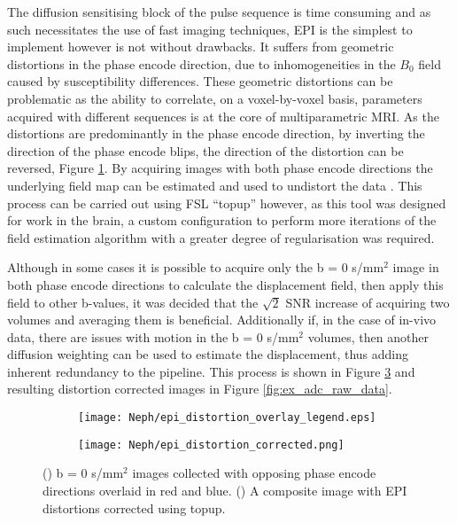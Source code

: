 The diffusion sensitising block of the pulse sequence is time consuming and as such necessitates the use of fast imaging techniques, \ac{EPI} is the simplest to implement however is not without drawbacks. It suffers from geometric distortions in the phase encode direction, due to inhomogeneities in the $B_0$ field caused by susceptibility differences. These geometric distortions can be problematic as the ability to correlate, on a voxel-by-voxel basis, parameters acquired with different sequences is at the core of multiparametric \ac{MRI}. As the distortions are predominantly in the phase encode direction, by inverting the direction of the phase encode blips, the direction of the distortion can be reversed, Figure \ref{fig:ex_epi_distortion_overlay}. By acquiring images with both phase encode directions the underlying field map can be estimated and used to undistort the data \cite{andersson_how_2003}. This process can be carried out using \ac{FSL} ``topup'' however, as this tool was designed for work in the brain, a custom configuration to perform more iterations of the field estimation algorithm with a greater degree of regularisation was required. 

Although in some cases it is possible to acquire only the b = 0 s/mm$^2$ image in both phase encode directions to calculate the displacement field, then apply this field to other b-values, it was decided that the $\sqrt{2}$ \ac{SNR} increase of acquiring two volumes and averaging them is beneficial. Additionally if, in the case of in-vivo data, there are issues with motion in the b = 0 s/mm$^2$ volumes, then another diffusion weighting can be used to estimate the displacement, thus adding inherent redundancy to the pipeline. This process is shown in Figure \ref{fig:ex_epi_distortion} and resulting distortion corrected images in Figure \ref{fig:ex_adc_raw_data}.

\begin{figure}[H]
	\centering
	\begin{subfigure}[c]{0.47\textwidth}
		\centering
		\texttt{[image: Neph/epi\_distortion\_overlay\_legend.eps]}
		\caption{}
		\label{fig:ex_epi_distortion_overlay}
	\end{subfigure}
	\hfill
	\begin{subfigure}[c]{0.47\textwidth}
		\centering
		\texttt{[image: Neph/epi\_distortion\_corrected.png]}
		\caption{}
		\label{fig:ex_epi_distortion_corrected}
	\end{subfigure}
	\caption{() b = 0 s/mm$^2$ images collected with opposing phase encode directions overlaid in red and blue. () A composite image with \ac{EPI} distortions corrected using topup.}
	\label{fig:ex_epi_distortion}
\end{figure}


